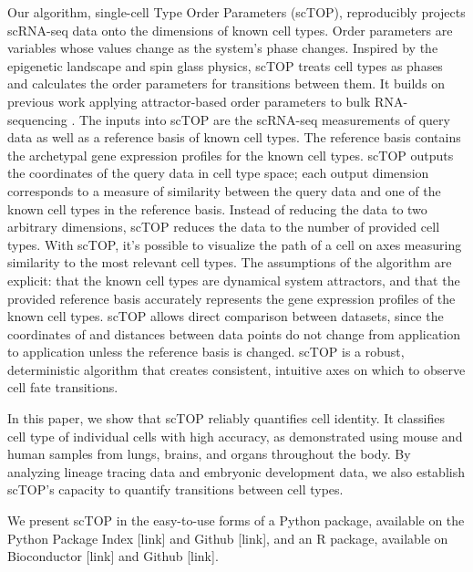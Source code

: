 \documentclass[aps,superscriptaddress, notitlepage,longbibliography]{revtex4-1}
\begin{document}
Our algorithm, single-cell Type Order Parameters (scTOP), reproducibly projects scRNA-seq data onto the dimensions of known cell types. Order parameters are variables whose values change as the system’s phase changes. Inspired by the epigenetic landscape and spin glass physics, scTOP treats cell types as phases and calculates the order parameters for transitions between them. It builds on previous work applying attractor-based order parameters to bulk RNA-sequencing\cite{lang_epigenetic_2014} \cite{dame_thyroid_2017}\cite{pusuluri_cellular_2017} \cite{ikonomou_vivo_2020}. The inputs into scTOP are the scRNA-seq measurements of query data as well as a reference basis of known cell types. The reference basis contains the archetypal gene expression profiles for the known cell types. scTOP outputs the coordinates of the query data in cell type space; each output dimension corresponds to a measure of similarity between the query data and one of the known cell types in the reference basis. Instead of reducing the data to two arbitrary dimensions, scTOP reduces the data to the number of provided cell types. With scTOP, it’s possible to visualize the path of a cell on axes measuring similarity to the most relevant cell types. The assumptions of the algorithm are explicit: that the known cell types are dynamical system attractors, and that the provided reference basis accurately represents the gene expression profiles of the known cell types. scTOP allows direct comparison between datasets, since the coordinates of and distances between data points do not change from application to application unless the reference basis is changed. scTOP is a robust, deterministic algorithm that creates consistent, intuitive axes on which to observe cell fate transitions.

In this paper, we show that scTOP reliably quantifies cell identity. It classifies cell type of individual cells with high accuracy, as demonstrated using mouse and human samples from lungs, brains, and organs throughout the body. By analyzing lineage tracing data and embryonic development data, we also establish scTOP’s capacity to quantify transitions between cell types. 

We present scTOP in the easy-to-use forms of a Python package, available on the Python Package Index [link] and Github [link], and an R package, available on Bioconductor [link] and Github [link].
\end{document}
